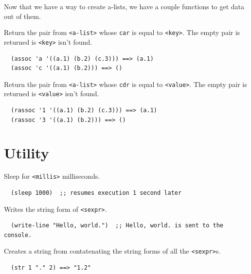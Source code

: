 \documentclass[12pt]{article}
\begin{document}
Now that we have a way to create a-lists, we have a couple functions
to get data out of them.\\


Return the pair from \verb|<a-list>| whose \verb|car| is equal to
\verb|<key>|. The empty pair is returned is \verb|<key>| isn't found.

\begin{verbatim}
  (assoc 'a '((a.1) (b.2) (c.3))) ==> (a.1)
  (assoc 'c '((a.1) (b.2))) ==> ()
\end{verbatim}


Return the pair from \verb|<a-list>| whose \verb|cdr| is equal to
\verb|<value>|. The empty pair is returned is \verb|<value>| isn't found.

\begin{verbatim}
  (rassoc '1 '((a.1) (b.2) (c.3))) ==> (a.1)
  (rassoc '3 '((a.1) (b.2))) ==> ()
\end{verbatim}

\section{Utility}


Sleep for \verb|<millis>| milliseconds.

\begin{verbatim}
  (sleep 1000)  ;; resumes execution 1 second later
\end{verbatim}


Writes the string form of \verb|<sexpr>|.

\begin{verbatim}
  (write-line "Hello, world.")  ;; Hello, world. is sent to the console.
\end{verbatim}


Creates a string from contatenating the string forms of all the \verb|<sexpr>|s.

\begin{verbatim}
  (str 1 "." 2) ==> "1.2"
\end{verbatim}

\end{document}
